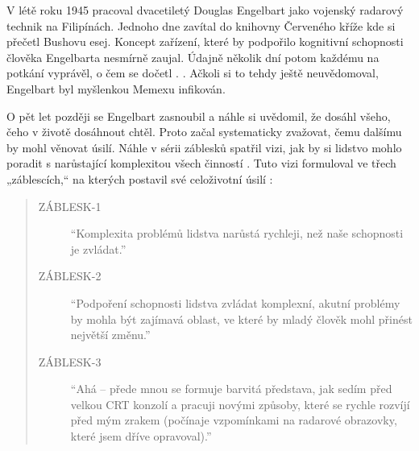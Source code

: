 V létě roku 1945 pracoval dvacetiletý Douglas Engelbart jako vojenský radarový technik na Filipínách. Jednoho dne zavítal do knihovny Červeného kříže kde si přečetl Bushovu esej. Koncept zařízení, které by podpořilo kognitivní schopnosti člověka Engelbarta nesmírně zaujal. Údajně několik dní potom každému na potkání vyprávěl, o čem se dočetl \autocite[7]{Markoff2005}. . Ačkoli si to tehdy ještě neuvědomoval, Engelbart byl myšlenkou Memexu infikován.

O pět let později se Engelbart zasnoubil a náhle si uvědomil, že dosáhl všeho, čeho v životě dosáhnout chtěl. Proto začal systematicky zvažovat, čemu dalšímu by mohl věnovat úsilí. Náhle v sérii záblesků spatřil vizi, jak by si lidstvo mohlo poradit s narůstající komplexitou všech činností \autocite[9]{Markoff2005}. Tuto vizi formuloval ve třech „záblescích,“ na kterých postavil své celoživotní úsilí \autocite[45]{Barnet2014}:

\begin{quote}
\begin{description}

\item[ZÁBLESK-1]
\enquote{Komplexita problémů lidstva narůstá rychleji, než naše schopnosti je zvládat.}

\item[ZÁBLESK-2]
\enquote{Podpoření schopnosti lidstva zvládat komplexní, akutní problémy by mohla být zajímavá oblast, ve které by mladý člověk mohl přinést největší změnu.} %

\item[ZÁBLESK-3]
\enquote{Ahá -- přede mnou se formuje barvitá představa, jak sedím před velkou CRT konzolí a pracuji novými způsoby, které se rychle rozvíjí před mým zrakem (počínaje vzpomínkami na radarové obrazovky, které jsem dříve opravoval).} %
\end{description}
\end{quote}


